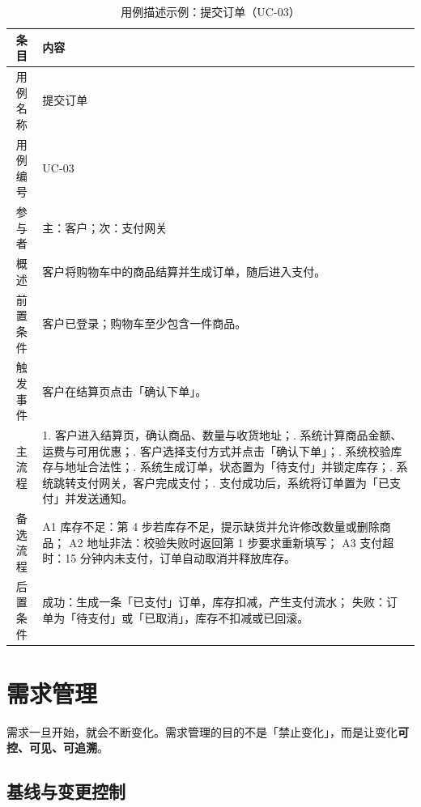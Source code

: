 \begin{table}[H]
\centering
\caption{用例描述示例：提交订单（UC-03）}
\begin{tabulary}{\textwidth}{CL}
\toprule
条目 & 内容 \\
\midrule
用例名称 & 提交订单 \\
用例编号 & UC-03 \\
参与者 & 主：客户；次：支付网关 \\
概述 & 客户将购物车中的商品结算并生成订单，随后进入支付。 \\
前置条件 & 客户已登录；购物车至少包含一件商品。 \\
触发事件 & 客户在结算页点击「确认下单」。 \\
主流程 &
1. 客户进入结算页，确认商品、数量与收货地址；. 系统计算商品金额、运费与可用优惠；. 客户选择支付方式并点击「确认下单」；. 系统校验库存与地址合法性；. 系统生成订单，状态置为「待支付」并锁定库存；. 系统跳转支付网关，客户完成支付；. 支付成功后，系统将订单置为「已支付」并发送通知。 \\
备选流程 &
A1 库存不足：第 4 步若库存不足，提示缺货并允许修改数量或删除商品；\newline
A2 地址非法：校验失败时返回第 1 步要求重新填写；\newline
A3 支付超时：15 分钟内未支付，订单自动取消并释放库存。 \\
后置条件 &
成功：生成一条「已支付」订单，库存扣减，产生支付流水；\newline
失败：订单为「待支付」或「已取消」，库存不扣减或已回滚。 \\
\bottomrule
\end{tabulary}
\end{table}

\section{需求管理}

需求一旦开始，就会不断变化。需求管理的目的不是「禁止变化」，而是让变化\textbf{可控、可见、可追溯}。

\subsection{基线与变更控制}


